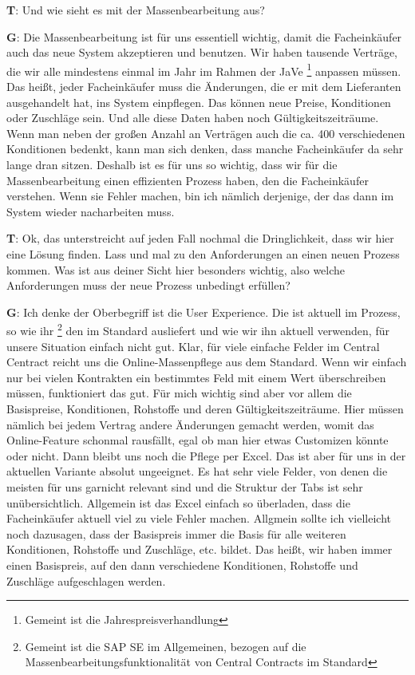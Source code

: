 \begin{list}{X:}{\setlength{\labelsep}{5mm}}
 \item[\textbf{T}:] Und wie sieht es mit der Massenbearbeitung aus?
 \item[\textbf{G}:] Die Massenbearbeitung ist für uns essentiell wichtig, damit die Facheinkäufer auch das neue System akzeptieren und benutzen. Wir haben tausende Verträge, die wir alle mindestens einmal im Jahr im Rahmen der JaVe \footnote{Gemeint ist die Jahrespreisverhandlung} anpassen müssen. Das hei\ss t, jeder Facheinkäufer muss die Änderungen, die er mit dem Lieferanten ausgehandelt hat, ins System einpflegen. Das können neue Preise, Konditionen oder Zuschläge sein. Und alle diese Daten haben noch Gültigkeitszeiträume. Wenn man neben der gro\ss en Anzahl an Verträgen auch die ca. 400 verschiedenen Konditionen bedenkt, kann man sich denken, dass manche Facheinkäufer da sehr lange dran sitzen. Deshalb ist es für uns so wichtig, dass wir für die Massenbearbeitung einen effizienten Prozess haben, den die Facheinkäufer verstehen. Wenn sie Fehler machen, bin ich nämlich derjenige, der das dann im System wieder nacharbeiten muss.
 \item[\textbf{T}:] Ok, das unterstreicht auf jeden Fall nochmal die Dringlichkeit, dass wir hier eine Lösung finden. Lass und mal zu den Anforderungen an einen neuen Prozess kommen. Was ist aus deiner Sicht hier besonders wichtig, also welche Anforderungen muss der neue Prozess unbedingt erfüllen?
 \item[\textbf{G}:] Ich denke der Oberbegriff ist die User Experience. Die ist aktuell im Prozess, so wie ihr \footnote{Gemeint ist die SAP SE im Allgemeinen, bezogen auf die Massenbearbeitungsfunktionalität von Central Contracts im Standard} den im Standard ausliefert und wie wir ihn aktuell verwenden, für unsere Situation einfach nicht gut. Klar, für viele einfache Felder im Central Centract reicht uns die Online-Massenpflege aus dem Standard. Wenn wir einfach nur bei vielen Kontrakten ein bestimmtes Feld mit einem Wert überschreiben müssen, funktioniert das gut. Für mich wichtig sind aber vor allem die Basispreise, Konditionen, Rohstoffe und deren Gültigkeitszeiträume. Hier müssen nämlich bei jedem Vertrag andere Änderungen gemacht werden, womit das Online-Feature schonmal rausfällt, egal ob man hier etwas Customizen könnte oder nicht. Dann bleibt uns noch die Pflege per Excel. Das ist aber für uns in der aktuellen Variante absolut ungeeignet. Es hat sehr viele Felder, von denen die meisten für uns garnicht relevant sind und die Struktur der Tabs ist sehr unübersichtlich. Allgemein ist das Excel einfach so überladen, dass die Facheinkäufer aktuell viel zu viele Fehler machen. Allgmein sollte ich vielleicht noch dazusagen, dass der Basispreis immer die Basis für alle weiteren Konditionen, Rohstoffe und Zuschläge, etc. bildet. Das hei\ss t, wir haben immer einen Basispreis, auf den dann verschiedene Konditionen, Rohstoffe und Zuschläge aufgeschlagen werden.

\end{list}
